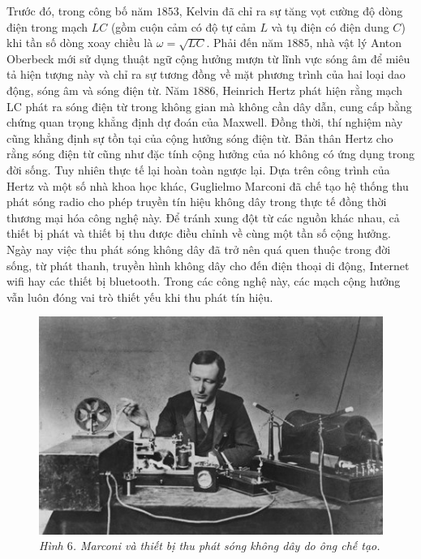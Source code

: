 \begin{multicols}{2}
	\vskip 0.1cm
	Trước đó, trong công bố năm $1853$, Kelvin đã chỉ ra sự tăng vọt cường độ dòng điện trong mạch $LC$ (gồm cuộn cảm có độ tự cảm $L$ và tụ điện có điện dung $C$) khi tần số dòng xoay chiều là $\omega =\sqrt{LC}$. Phải đến năm $1885$, nhà vật lý Anton Oberbeck mới sử dụng thuật ngữ cộng hưởng mượn từ lĩnh vực sóng âm để miêu tả hiện tượng này và chỉ ra sự tương đồng về mặt phương trình của hai loại dao động, sóng âm và sóng điện từ. 
	\vskip 0.1cm
	Năm $1886$, Heinrich Hertz phát hiện rằng mạch LC phát ra sóng điện từ trong không gian mà không cần dây dẫn, cung cấp bằng chứng quan trọng khẳng định dự đoán của Maxwell. Đồng thời, thí nghiệm này cũng khẳng định sự tồn tại của cộng hưởng sóng điện từ.
	\vskip 0.1cm
	Bản thân Hertz cho rằng sóng điện từ cũng như đặc tính cộng hưởng của nó không có ứng dụng trong đời sống. Tuy nhiên thực tế lại hoàn toàn ngược lại. Dựa trên công trình của Hertz và một số nhà khoa học khác, Guglielmo Marconi đã chế tạo hệ thống thu phát sóng radio cho phép truyền tín hiệu không dây trong thực tế đồng thời thương mại hóa công nghệ này. Để tránh xung đột từ các nguồn khác nhau, cả thiết bị phát và thiết bị thu được điều chỉnh về cùng một tần số cộng hưởng. Ngày nay việc thu phát sóng không dây đã trở nên quá quen thuộc trong đời sống, từ phát thanh, truyền hình không dây cho đến điện thoại di động, Internet wifi hay các thiết bị bluetooth. Trong các công nghệ này, các mạch cộng hưởng vẫn luôn đóng vai trò thiết yếu khi thu phát tín hiệu.
		\begin{figure}[H]
		\centering
		\vspace*{-5pt}
		\captionsetup{labelformat= empty, justification=centering}
		\includegraphics[width=1\linewidth]{8}
		\caption{\small\textit{\color{timhieukhoahoc}Hình $6$. Marconi và thiết bị thu phát sóng không dây do ông chế tạo.}}

\end{figure}
\end{multicols}
